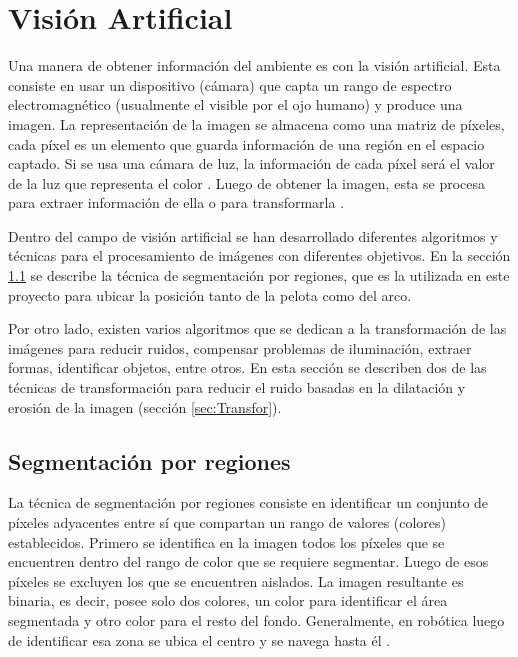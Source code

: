 \section{Visión Artificial} \label{sect:Vision_Artificial}

Una manera de obtener información del ambiente es con la visión artificial. Esta consiste en usar un dispositivo (cámara) que capta un rango de espectro electromagnético (usualmente el visible por el ojo humano) y produce una imagen. La representación de la imagen se almacena como una matriz de píxeles, cada píxel es un elemento que guarda información de una región en el espacio captado. Si se usa una cámara de luz, la información de cada píxel será el valor de la luz que representa el color . Luego de obtener la imagen, esta se procesa para extraer información de ella o para transformarla \cite{AiRobotics}.

Dentro del campo de visión artificial se han desarrollado diferentes algoritmos y t\'ecnicas para el procesamiento de imágenes con diferentes objetivos. En la sección \ref{sec:Segmentacion} se describe la t\'ecnica de segmentaci\'on por regiones, que es la utilizada en este proyecto para ubicar la posición tanto de la pelota como del arco. 

Por otro lado, existen varios algoritmos que se dedican a la transformación de las imágenes para reducir ruidos, compensar problemas de iluminación, extraer formas, identificar objetos, entre otros. En esta sección se describen dos de las técnicas de transformación para reducir el ruido basadas en la dilatación y erosión de la imagen (secci\'on \ref{sec:Transfor}). 
 
\subsection{Segmentaci\'on por regiones}\label{sec:Segmentacion}

La técnica de segmentación por regiones consiste en identificar un conjunto de píxeles adyacentes entre sí que compartan un rango de valores (colores) establecidos. Primero se identifica en la imagen todos los píxeles que se encuentren dentro del rango de color que se requiere segmentar. Luego de esos píxeles se excluyen los que se encuentren aislados. La imagen resultante es binaria, es decir, posee solo dos colores, un color para identificar el área segmentada y otro color para el resto del fondo.
Generalmente, en robótica luego de identificar esa zona se ubica el centro y se navega hasta él \cite{AiRobotics}. 

